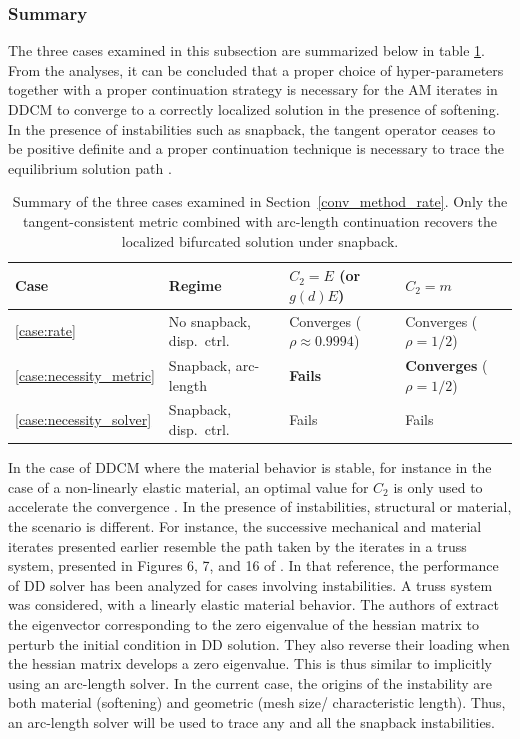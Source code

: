 \documentclass[10pt]{cas-sc}
\begin{document}
\subsubsection*{Summary}
The three cases examined in this subsection are summarized below in table \ref{tab:necessity_summary}. From the analyses, it can be concluded that a proper choice of hyper-parameters together with a proper continuation strategy is necessary for the AM iterates in DDCM to converge to a correctly localized solution in the presence of softening. In the presence of instabilities such as snapback, the tangent operator ceases to be positive definite and a proper continuation technique is necessary to trace the equilibrium solution path \cite{deBorst1986,deBorst1987b,Baldelli2021}. 

\begin{table}[h]
	\centering
	\caption{Summary of the three cases examined in Section~\ref{conv_method_rate}. Only the tangent-consistent metric combined with arc-length continuation recovers the localized bifurcated solution under snapback.}
	\label{tab:necessity_summary}
	\begin{tabular}{llll}
		\hline
		Case & Regime & $C_2 = E$ (or $g(d) E$) & $C_2 = m$ \\
		\hline
		\ref{case:rate} & No snapback, disp.\ ctrl.\ & Converges ($\rho \approx 0.9994$) & Converges ($\rho = 1/2$) \\
		\ref{case:necessity_metric} & Snapback, arc-length & \textbf{Fails}  & \textbf{Converges} ($\rho = 1/2$) \\
		\ref{case:necessity_solver} & Snapback, disp.\ ctrl.\ & Fails & Fails \\
		\hline
	\end{tabular}
\end{table}



In the case of DDCM where the material behavior is stable, for instance in the case of a non-linearly elastic material, an optimal value for $C_2$ is only used to accelerate the convergence \cite{Nguyen2022}. In the presence of instabilities, structural or material, the scenario is different. For instance, the successive mechanical and material iterates presented earlier resemble the path taken by the iterates in a truss system, presented in Figures 6, 7, and 16 of \cite{Kuang2023}. In that reference, the performance of DD solver has been analyzed for cases involving instabilities. A truss system was considered, with a linearly elastic material behavior. The authors of \cite{Kuang2023} extract the eigenvector corresponding to the zero eigenvalue of the hessian matrix to perturb the initial condition in DD solution. They also reverse their loading when the hessian matrix develops a zero eigenvalue. This is thus similar to implicitly using an arc-length solver. In the current case, the origins of the instability are both material (softening) and geometric (mesh size/ characteristic length). Thus, an arc-length solver will be used to trace any and all the  snapback instabilities.
\end{document}
